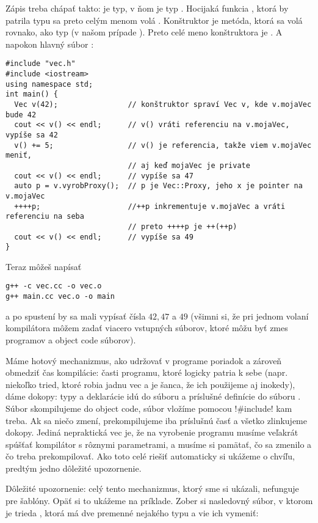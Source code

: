 Zápis  treba chápať takto:  je typ, v ňom je typ . Hocijaká funkcia , ktorá
by patrila typu  sa preto celým menom volá . Konštruktor je metóda, ktorá sa volá rovnako, ako typ
(v našom prípade ). Preto celé meno konštruktora je .
A napokon hlavný súbor :

\begin{lstlisting}
#include "vec.h"
#include <iostream>
using namespace std;
int main() {
  Vec v(42);                // konštruktor spraví Vec v, kde v.mojaVec bude 42
  cout << v() << endl;      // v() vráti referenciu na v.mojaVec, vypíše sa 42
  v() += 5;                 // v() je referencia, takže viem v.mojaVec meniť, 
                            // aj keď mojaVec je private
  cout << v() << endl;      // vypíše sa 47
  auto p = v.vyrobProxy();  // p je Vec::Proxy, jeho x je pointer na v.mojaVec
  ++++p;                    //++p inkrementuje v.mojaVec a vráti referenciu na seba
                            // preto ++++p je ++(++p)
  cout << v() << endl;      // vypíše sa 49
}
\end{lstlisting}

Teraz môžeš napísať

\begin{Verbatim}[frame=single]
g++ -c vec.cc -o vec.o
g++ main.cc vec.o -o main
\end{Verbatim}

a po spustení  by sa mali vypísať čísla $42, 47$ a $49$ (všimni si, že pri jednom volaní kompilátora môžem 
zadať viacero vstupných súborov, ktoré môžu byť zmes programov a object code súborov).


Máme hotový mechanizmus, ako udržovať v programe poriadok a zároveň obmedziť čas kompilácie: časti programu, ktoré
logicky patria k sebe (napr. niekoľko tried, ktoré robia jadnu vec a je šanca, že ich použijeme aj inokedy), dáme 
dokopy: typy a deklarácie idú do súboru  a príslušné definície do súboru . Súbor  skompilujeme
do object code, súbor  vložíme pomocou \prg!#include! kam treba. Ak sa niečo zmení, prekompilujeme iba príslušnú časť
a všetko zlinkujeme dokopy. Jediná nepraktická vec je, že na vyrobenie programu musíme veľakrát spúšťať kompilátor s rôznymi parametrami,
a musíme si pamätať, čo sa zmenilo a čo treba prekompilovať. Ako toto celé riešiť automaticky si ukážeme o chvíľu, 
predtým jedno dôležité upozornenie.


Dôležité upozornenie: celý tento mechanizmus, ktorý sme si ukázali, nefunguje pre šablóny. 
Opäť si to ukážeme na príklade. Zober si nasledovný súbor, v ktorom je trieda , ktorá má 
dve premenné nejakého typu a vie ich vymeniť:

